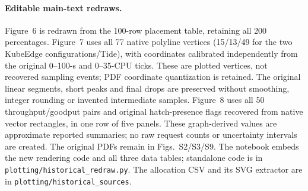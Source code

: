 \paragraph{Editable main-text redraws.}
Figure~6 is redrawn from the 100-row placement table, retaining all 200 percentages. Figure~7 uses all 77 native polyline vertices (15/13/49 for the two KubeEdge configurations/Tide), with coordinates calibrated independently from the original 0--100-s and 0--35-CPU ticks. These are plotted vertices, not recovered sampling events; PDF coordinate quantization is retained. The original linear segments, short peaks and final drops are preserved without smoothing, integer rounding or invented intermediate samples. Figure~8 uses all 50 throughput/goodput pairs and original hatch-presence flags recovered from native vector rectangles, in one row of five panels. These graph-derived values are approximate reported summaries; no raw request counts or uncertainty intervals are created. The original PDFs remain in Figs.~S2/S3/S9. The notebook embeds the new rendering code and all three data tables; standalone code is in \texttt{plotting/historical\_redraw.py}. The allocation CSV and its SVG extractor are in \texttt{plotting/historical\_sources}.
